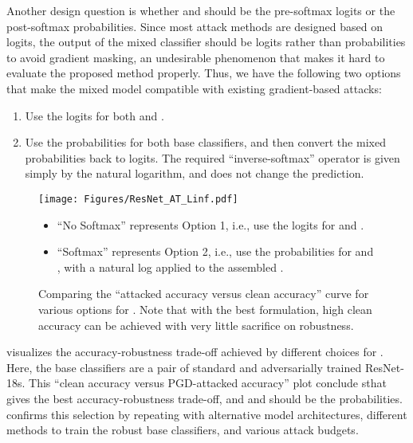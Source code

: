 \documentclass[11pt, letterpaper]{article}
\theoremstyle{plain}
\theoremstyle{definition}
\begin{document}
Another design question is whether  and  should be the pre-softmax logits or the post-softmax probabilities. Since most attack methods are designed based on logits, the output of the mixed classifier should be logits rather than probabilities to avoid gradient masking, an undesirable phenomenon that makes it hard to evaluate the proposed method properly. Thus, we have the following two options that make the mixed model compatible with existing gradient-based attacks:
\begin{enumerate}[leftmargin=6mm]
	\setlength\itemsep{1pt}
	\item Use the logits for both  and .
	\item Use the probabilities for both base classifiers, and then convert the mixed probabilities back to logits. The required ``inverse-softmax'' operator is given simply by the natural logarithm, and does not change the prediction.
\end{enumerate}

\begin{figure}[t]
	\centering
	\begin{minipage}{.56\textwidth}
		\texttt{[image: Figures/ResNet\_AT\_Linf.pdf]}
	\end{minipage}
	\begin{minipage}{.38\textwidth}
		\begin{itemize}[leftmargin=4mm]
			\setlength\itemsep{.8em}
			\item \small ``No Softmax'' represents Option 1, i.e., use the logits for  and . 
			\item \small ``Softmax'' represents Option 2, i.e., use the probabilities for  and , with a natural log applied to the assembled . 
		\end{itemize}
	\end{minipage}
	\vspace{-2mm}
	\caption{Comparing the ``attacked accuracy versus clean accuracy'' curve for various options for . Note that with the best formulation, high clean accuracy can be achieved with very little sacrifice on robustness.}
	\label{fig:compare_R}
\end{figure}

 visualizes the accuracy-robustness trade-off achieved by different choices for . Here, the base classifiers are a pair of standard and adversarially trained ResNet-18s. This ``clean accuracy versus PGD-attacked accuracy'' plot conclude sthat  gives the best accuracy-robustness trade-off, and  and  should be the probabilities.  confirms this selection by repeating  with alternative model architectures, different methods to train the robust base classifiers, and various attack budgets.
\end{document}
